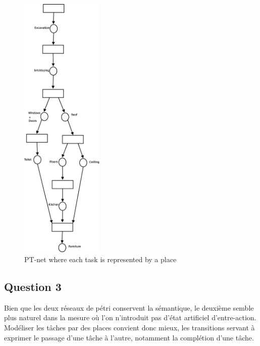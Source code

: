 \begin{figure}[h!]
\begin{center}
\includegraphics[height = 13cm]{exo42.eps} 
\caption{PT-net where each task is represented by a place}
\end{center} 

\end{figure}
\subsection*{Question 3}

Bien que les deux réseaux de pétri conservent la sémantique, le
deuxième semble plus naturel dans la mesure où l'on n'introduit pas
d'état artificiel d'entre-action. Modéliser les tâches par des places
convient donc mieux, les transitions servant à exprimer le passage
d'une tâche à l'autre, notamment la complétion d'une tâche.
